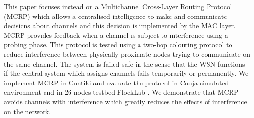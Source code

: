 This paper focuses instead on a Multichannel Cross-Layer Routing Protocol (MCRP) which allows a centralised intelligence to make and communicate decisions about channels and this decision is implemented by the MAC layer. MCRP provides feedback when a channel is subject to interference using a probing phase. This protocol is tested using a two-hop colouring protocol to reduce interference between physically proximate nodes trying to communicate on the same channel. The system is failed safe in the sense that the WSN functions if the central system which assigns channels fails temporarily or permanently.
We implement MCRP in Contiki and evaluate the protocol in Cooja simulated environment and in 26-nodes testbed FlockLab \cite{flocklab}. We demonstrate that MCRP avoids channels with interference which greatly reduces the effects of interference on the network.





